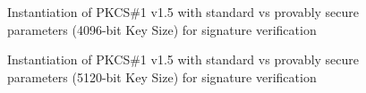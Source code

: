 \documentclass[]{final_report}
\theoremstyle{definition}
\begin{document}
\begin{figure}[H]
    \centering %
     \caption{Instantiation of PKCS\#1 v1.5 with standard vs provably secure parameters (4096-bit Key Size) for signature verification}
    \begin{minipage}{\textwidth}
        \centering
    \end{minipage}
         \label{pkcs_verify_4096bit_table}
\end{figure}

\begin{figure}[H]
    \centering %
     \caption{Instantiation of PKCS\#1 v1.5 with standard vs provably secure parameters (5120-bit Key Size) for signature verification}
    \begin{minipage}{\textwidth}
        \centering
    \end{minipage}
       \label{pkcs_verify_5120bit_table}
\end{figure}
\end{document}

